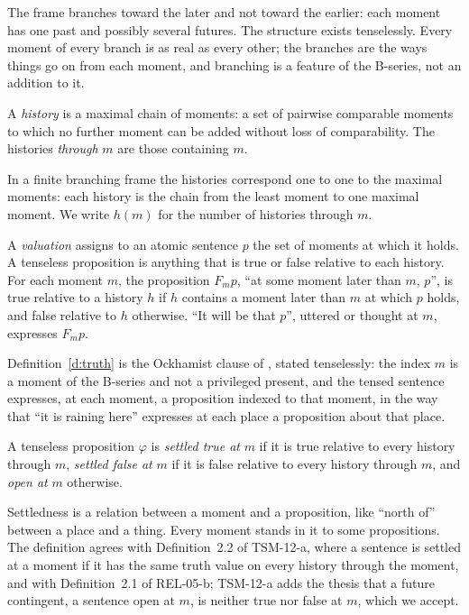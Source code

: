 \documentclass{situationist-preprint}
\begin{document}
The frame branches toward the later and not toward the earlier: each moment has one past and possibly several futures. The structure exists tenselessly. Every moment of every branch is as real as every other; the branches are the ways things go on from each moment, and branching is a feature of the B-series, not an addition to it.

\begin{definition}[History]\label{d:history}
A \emph{history} is a maximal chain of moments: a set of pairwise comparable moments to which no further moment can be added without loss of comparability. The histories \emph{through} $m$ are those containing $m$.
\end{definition}

In a finite branching frame the histories correspond one to one to the maximal moments: each history is the chain from the least moment to one maximal moment. We write $h(m)$ for the number of histories through $m$.

\begin{definition}\label{d:truth}
A \emph{valuation} assigns to an atomic sentence $p$ the set of moments at which it holds. A tenseless proposition is anything that is true or false relative to each history. For each moment $m$, the proposition $F_m p$, \enquote{at some moment later than $m$, $p$}, is true relative to a history $h$ if $h$ contains a moment later than $m$ at which $p$ holds, and false relative to $h$ otherwise. \enquote{It will be that $p$}, uttered or thought at $m$, expresses $F_m p$.
\end{definition}

Definition~\ref{d:truth} is the Ockhamist clause of \citet{Prior1967}, stated tenselessly: the index $m$ is a moment of the B-series and not a privileged present, and the tensed sentence expresses, at each moment, a proposition indexed to that moment, in the way that \enquote{it is raining here} expresses at each place a proposition about that place.

\begin{definition}[Settledness]\label{d:settled}
A tenseless proposition $\varphi$ is \emph{settled true at} $m$ if it is true relative to every history through $m$, \emph{settled false at} $m$ if it is false relative to every history through $m$, and \emph{open at} $m$ otherwise.
\end{definition}

Settledness is a relation between a moment and a proposition, like \enquote{north of} between a place and a thing. Every moment stands in it to some propositions. The definition agrees with Definition~2.2 of TSM-12-a, where a sentence is settled at a moment if it has the same truth value on every history through the moment, and with Definition~2.1 of REL-05-b; TSM-12-a adds the thesis that a future contingent, a sentence open at $m$, is neither true nor false at $m$, which we accept.
\end{document}
